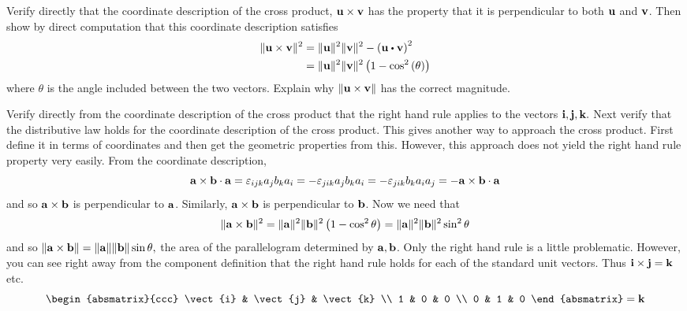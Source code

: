 \begin{enumialphparenastyle}
\begin{ex} Verify directly that the coordinate description of the cross product, 
${\bf u}\times {\bf v}$ has the property that it is perpendicular to both 
${\bf u}$ and ${\bf v}$. Then show by direct computation that this
coordinate description satisfies
\begin{align*}
\vectlength \vect{u}\times \vect{v}\vectlength ^{2}& =\vectlength \vect{u}
\vectlength ^{2}\vectlength \vect{v}\vectlength ^{2}-\tup{\vect{u}\dotprod \vect{v}} ^{2} \\
& =\vectlength \vect{u}\vectlength ^{2}\vectlength \vect{v}\vectlength
^{2}\tup{1-\cos ^{2}\tup{\theta } }
\end{align*}
where $\theta $ is the angle included between the two vectors. Explain why 
$\| {\bf u}\times {\bf v}\| $ has the correct magnitude.
\begin{sol}
Verify directly from the coordinate description of the cross product that the right hand rule applies to the vectors ${\bf i},{\bf j},{\bf k}.$ Next verify that the
distributive law holds for the coordinate description of the cross product.
This gives another way to approach the cross product. First define it in
terms of coordinates and then get the geometric properties from this.
However, this approach does not yield the right hand rule property very
easily. From the coordinate description,
\[
{\bf a}\times {\bf b}\cdot {\bf a}=\varepsilon _{ijk}a_{j}b_{k}a_{i}=-\varepsilon
_{jik}a_{j}b_{k}a_{i}=-\varepsilon _{jik}b_{k}a_{i}a_{j}=-{\bf a}\times
{\bf b}\cdot {\bf a}
\]
and so ${\bf a}\times {\bf b}$ is perpendicular to ${\bf a}$. Similarly, $
{\bf a}\times {\bf b}$ is perpendicular to ${\bf b}$. Now we need that 
\[
\| {\bf a}\times {\bf b}\| ^{2}=\| {\bf a}
\| ^{2}\| {\bf b}\| ^{2}\left(1-\cos
^{2}\theta \right) =\| {\bf a}\| ^{2}\| {\bf b
}\| ^{2}\sin ^{2}\theta
\]
and so $\| {\bf a}\times {\bf b}\| =\| {\bf a}
\| \| {\bf b}\| \sin \theta ,$ the area of the
parallelogram determined by ${\bf a},{\bf b}$. Only the right hand rule is a
little problematic. However, you can see right away from the component
definition that the right hand rule holds for each of the standard unit
vectors. Thus ${\bf i}\times {\bf j}={\bf k}$ etc.
\[
\begin{absmatrix}{ccc}
\vect{i} & \vect{j} & \vect{k} \\
1 & 0 & 0 \\
0 & 1 & 0
\end{absmatrix}=\vect{k}
\]
\end{sol}
\end{ex}


\end{enumialphparenastyle}